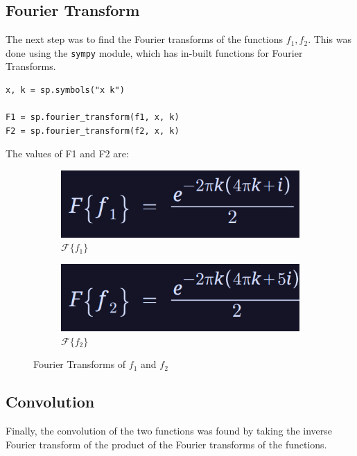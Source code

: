 \documentclass[12pt]{report}
\begin{document}
\subsection{Fourier Transform}
The next step was to find the Fourier transforms of the functions $f_1, f_2$. This was done using the \texttt{sympy} module, which has in-built functions for Fourier Transforms.

\begin{lstlisting}[caption={Finding the Fourier transforms of the functions}]
x, k = sp.symbols("x k")

F1 = sp.fourier_transform(f1, x, k)
F2 = sp.fourier_transform(f2, x, k)
\end{lstlisting}

The values of F1 and F2 are:

\begin{figure}[H]
    \centering
    \begin{subfigure}{0.45\textwidth}
        \centering
        \includegraphics[width=\linewidth]{F1.png}
        \caption{$\mathcal{F}\{f_1\}$}
        \label{fig:F1}
    \end{subfigure}
    \begin{subfigure}{0.45\textwidth}
        \centering
        \includegraphics[width=\linewidth]{F2.png}
        \caption{$\mathcal{F}\{f_2\}$}
        \label{fig:F2}
    \end{subfigure}
    \caption{Fourier Transforms of $f_1$ and $f_2$}
\end{figure}

\subsection{Convolution}
Finally, the convolution of the two functions was found by taking the inverse Fourier transform of the product of the Fourier transforms of the functions.
\end{document}
